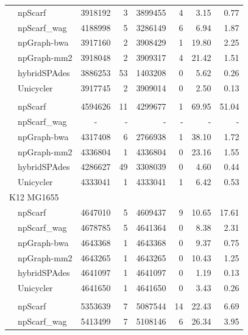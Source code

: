 \begin{longtable}[!hpt]{llcrrrrr}
\nobreakmidrule
& npScarf & 3918192  &  3  &  3899455  &  4  & 3.15  & 0.77 \\*
& npScarf\_wag & 4188998  &  5  &  3286149  &  6  & 6.94  & 1.87 \\*
& npGraph-bwa & 3917160  &  2  &  3908429  &  1 & 19.80  & 2.25 \\*
& npGraph-mm2 & 3918048  &  2  &  3909317  &  4 & 21.42  & 1.51 \\*
& hybridSPAdes &  3886253 &  53  &  1403208  &  0  & 5.62  & 0.26\\*
& Unicycler & 3917745  &  2 & 3909014  & 0  & 2.50  &  0.13\\
\hline
\rowcolor{Gray}
\multicolumn{8}{l}{\emph{Acinetobacter} AB30} \\* %
\nobreakmidrule
\rowcolor{Gray}
& npScarf & 4594626  &  11  &  4299677  &  1  & 69.95  & 51.04\\*
\rowcolor{Gray}
& npScarf\_wag & -  &  -  &  -  & -   &  - & -\\*
\rowcolor{Gray}
& npGraph-bwa & 4317408  &  6  &  2766938  &  1  & 38.10  & 1.72\\*
\rowcolor{Gray}
& npGraph-mm2 & 4336804  &  1  &  4336804  & 0   &  23.16 & 1.55\\*
\rowcolor{Gray}
& hybridSPAdes & 4286627  &  49  &  3308039  &  0  &  4.60 &  0.44\\*
\rowcolor{Gray}
& Unicycler &  4333041 &  1  &  4333041  &  1  &  6.42 &  0.53\\
\hline
\multicolumn{8}{l}{\ec{} K12 MG1655} \\* %
\nobreakmidrule
& npScarf & 4647010  &  5  &  4609437  &  9  & 10.65  & 17.61 \\*
& npScarf\_wag &  4678785 &  5  &  4641364  &  0  & 8.38  &  2.31\\*
& npGraph-bwa & 4643368  &  1  &  4643368  & 0  &  9.37 & 0.75 \\*
& npGraph-mm2 & 4643265  &  1  &  4643265  &  0 &  10.43 & 1.25 \\*
& hybridSPAdes &  4641097 &  1  &  4641097  &  0  & 1.19  & 0.13\\*
& Unicycler & 4641650  &  1 &  4641650 &  0 & 3.43  & 0.26 \\
\hline
\rowcolor{Gray}
\multicolumn{8}{l}{\ec{} O25b H4-ST131} \\* %
\nobreakmidrule
\rowcolor{Gray}
& npScarf &  5353639 &  7  &  5087544  &  14  &  22.43 & 6.69\\*
\rowcolor{Gray}
& npScarf\_wag & 5413499  &  7  &  5108146  &  6  &  26.34 & 3.95\\*

\end{longtable}
